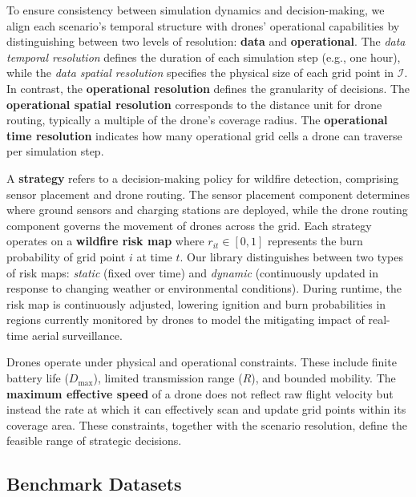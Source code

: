 \documentclass{article}
\newcommand{\set}[1]{\mathcal{#1}}
\begin{document}
To ensure consistency between simulation dynamics and decision-making, we align each scenario’s temporal structure with drones’ operational capabilities by distinguishing between two levels of resolution: \textbf{data} and \textbf{operational}. The \emph{data temporal resolution} defines the duration of each simulation step (e.g., one hour), while the \emph{data spatial resolution} specifies the physical size of each grid point in $\set I$. In contrast, the \textbf{operational resolution} defines the granularity of decisions. The \textbf{operational spatial resolution} corresponds to the distance unit for drone routing, typically a multiple of the drone’s coverage radius. The \textbf{operational time resolution} indicates how many operational grid cells a drone can traverse per simulation step.


A \textbf{strategy} refers to a decision-making policy for wildfire detection, comprising sensor placement and drone routing. The sensor placement component determines where ground sensors and charging stations are deployed, while the drone routing component governs the movement of drones across the grid. Each strategy operates on a \textbf{wildfire risk map} where $r_{it} \in [0,1]$ represents the burn probability of grid point $i$ at time $t$. Our library distinguishes between two types of risk maps: \emph{static} (fixed over time) and \emph{dynamic} (continuously updated in response to changing weather or environmental conditions). During runtime, the risk map is continuously adjusted, lowering ignition and burn probabilities in regions currently monitored by drones to model the mitigating impact of real-time aerial surveillance.

Drones operate under physical and operational constraints. These include finite battery life ($D_{\max}$), limited transmission range ($R$), and bounded mobility. The \textbf{maximum effective speed} of a drone does not reflect raw flight velocity but instead the rate at which it can effectively scan and update grid points within its coverage area. These constraints, together with the scenario resolution, define the feasible range of strategic decisions.


\subsection{Benchmark Datasets}\label{subsec:benchmarkdatasets} 

\end{document}
